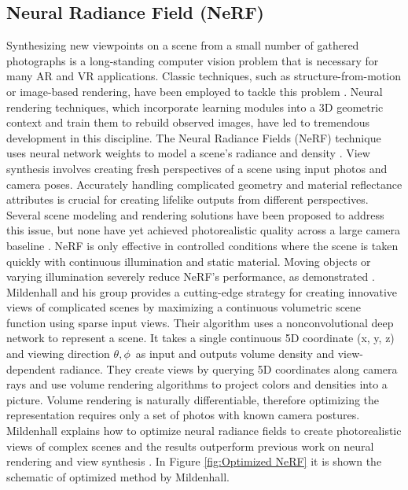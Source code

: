 \subsection{Neural Radiance Field (NeRF)}
Synthesizing new viewpoints on a scene from a small number of gathered photographs is a long-standing computer vision problem that is necessary for many AR and VR applications.
Classic techniques, such as structure-from-motion or image-based rendering, have been employed to tackle this problem 
 \cite{martin2021nerf,shum2008image}. Neural rendering techniques, which incorporate learning modules into a 3D geometric context and train them to rebuild observed images, have led to tremendous development in this discipline. The Neural Radiance Fields (NeRF) technique uses neural network weights to model a scene's radiance and density \cite{mildenhall2021nerf}.
 View synthesis involves creating fresh perspectives of a scene using input photos and camera poses. Accurately handling complicated geometry and material reflectance attributes is crucial for creating lifelike outputs from different perspectives. 
Several scene modeling and rendering solutions have been proposed to address this issue, but none have yet achieved photorealistic quality across a large camera baseline \cite{mildenhall2021nerf}.
NeRF is only effective in controlled conditions where the scene is taken quickly with continuous illumination and static material. Moving objects or varying illumination severely reduce NeRF's performance, as demonstrated \cite{martin2021nerf}. Mildenhall and his group provides a cutting-edge strategy for creating innovative views of complicated scenes by maximizing a continuous volumetric scene function using sparse input views. Their algorithm uses a nonconvolutional deep network to represent a scene. It takes a single continuous 5D coordinate (x, y, z) and viewing direction  \(\theta,\phi\)\ as input and outputs volume density and view-dependent radiance. They create views by querying 5D coordinates along camera rays and use volume rendering algorithms to project colors and densities into a picture. Volume rendering is naturally differentiable, therefore optimizing the representation requires only a set of photos with known camera postures. Mildenhall explains how to optimize neural radiance fields to create photorealistic views of complex scenes and the results outperform previous work on neural rendering and view synthesis \cite{mildenhall2021nerf}. 
In Figure \ref{fig:Optimized NeRF} it is shown the schematic of optimized method by Mildenhall.
